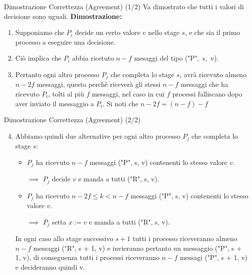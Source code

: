 \documentclass{beamer}
\begin{document}
\begin{frame}{Dimostrazione Correttezza (Agreement) (1/2)}
    Va dimostrato che tutti i valori di decisione sono uguali.\newline
    \textbf{Dimostrazione:}
    \begin{enumerate}
        \item<1-> Supponiamo che $P_{i}$ decide un certo valore $v$ nello stage $s$, e che sia il primo processo a eseguire una decisione.
        \item<2-> Ciò implica che $P_{i}$ abbia ricetuto $n - f$ mesaggi del tipo \mbox{("P", s, v)}.
        \item<3-> Pertanto ogni altro processo $P_{j}$ che completa lo stage $s$, avrà ricevuto almeno $n - 2f$
        messaggi, questo perchè riceverà gli stessi $n - f$ messaggi che ha ricevuto $P_{i}$, tolti al più $f$ messaggi, nel caso in cui $f$ processi falliscano dopo aver inviato il messaggio a $P_{i}$. Si noti che $n - 2f = (n - f) - f$
    \end{enumerate}
\end{frame}

\begin{frame}{Dimostrazione Correttezza (Agreement) (2/2)}
    \begin{enumerate}
        \setcounter{enumi}{3}
        \item Abbiamo quindi due alternative per ogni altro processo $P_{j}$ che completa lo stage $s$:
        \begin{itemize}
            \item $P_{j}$ ha ricevuto $n - f$ messaggi ("P", s, v) contenenti lo stesso valore $v$.
            \begin{addmargin}[1em]{2em}
            $\implies$ $P_{j}$ decide $v$ e manda a tutti ("R", s, v). 
            \end{addmargin}
            
            \item $P_{j}$ ha ricevuto $n - 2f \leq k < n - f$ messaggi ("P", s, v) contenenti lo stesso valore $v$.
            \begin{addmargin}[1em]{2em}
            $\implies$ $P_{j}$ setta $x := v$ e manda a tutti ("R", s, v). 
            \end{addmargin}
        \end{itemize}
        
        In ogni caso allo stage successivo $s + 1$ tutti i processo riceveranno almeno $n - f$ messaggi ("R", s + 1, v) e invieranno pertanto un messaggio ("P", s + 1, v), di conseguenza tutti i processi riceveranno $n - f$ messagi ("P", s + 1, v) e decideranno quindi v.
    \end{enumerate}
\end{frame}
\end{document}
